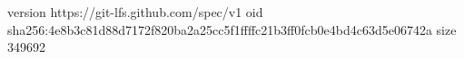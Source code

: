 version https://git-lfs.github.com/spec/v1
oid sha256:4e8b3c81d88d7172f820ba2a25cc5f1ffffc21b3ff0fcb0e4bd4c63d5e06742a
size 349692

